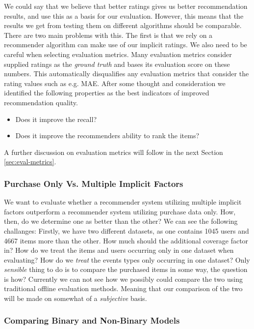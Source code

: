 We could say that we believe that better ratings gives us better recommendation results, and use this
as a basis for our evaluation. However, this means that the results we get from testing them
on different algorithms should be comparable. There are two main problems with this. The first is that
we rely on a recommender algorithm can make use of our implicit ratings. We also need to be careful
when selecting evaluation metrics. Many evaluation metrics consider supplied ratings as the \emph{ground truth}
and bases its evaluation score on these numbers. This automatically disqualifies any evaluation metrics
that consider the rating values such as e.g. MAE. After some thought and consideration
we identified the following properties as the best indicators of improved recommendation quality.

\begin{itemize}
\item Does it improve the recall?
\item Does it improve the recommenders ability to rank the items?
\end{itemize}

A further discussion on evaluation metrics will follow in the next Section \ref{sec:eval-metrics}.

\subsubsection{Purchase Only Vs. Multiple Implicit Factors}


We want to evaluate whether a recommender system utilizing multiple implicit factors outperform
a recommender system utilizing purchase data only.
How, then, do we determine one as better than the other? We can see the following challanges:
Firstly, we have two different datasets, as one contains 1045 users and 4667 items more than the
other. How much should the additional coverage factor in? How do we treat the items and users
occurring only in one dataset when evaluating? How do we \emph{treat} the events types only
occurring in one dataset? Only \emph{sensible} thing to do is to compare the purchased items
in some way, the question is how? Currently we can not see how we possibly could compare the
two using traditional offline evaluation methods. Meaning that our comparison of the two will
be made on somewhat of a \emph{subjective} basis.
	
\subsubsection{Comparing Binary and Non-Binary Models}

